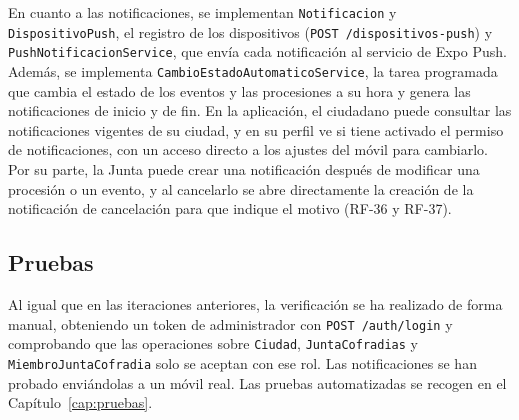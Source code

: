 En cuanto a las notificaciones, se implementan \texttt{Notificacion} y \texttt{DispositivoPush}, el registro de los dispositivos (\texttt{POST /dispositivos-push}) y \texttt{PushNotificacionService}, que envía cada notificación al servicio de Expo Push. Además, se implementa \texttt{CambioEstadoAutomaticoService}, la tarea programada que cambia el estado de los eventos y las procesiones a su hora y genera las notificaciones de inicio y de fin. En la aplicación, el ciudadano puede consultar las notificaciones vigentes de su ciudad, y en su perfil ve si tiene activado el permiso de notificaciones, con un acceso directo a los ajustes del móvil para cambiarlo. Por su parte, la Junta puede crear una notificación después de modificar una procesión o un evento, y al cancelarlo se abre directamente la creación de la notificación de cancelación para que indique el motivo (RF-36 y RF-37).


\subsection{Pruebas}

Al igual que en las iteraciones anteriores, la verificación se ha realizado de forma manual, obteniendo un token de administrador con \texttt{POST /auth/login} y comprobando que las operaciones sobre \texttt{Ciudad}, \texttt{JuntaCofradias} y \texttt{MiembroJuntaCofradia} solo se aceptan con ese rol. Las notificaciones se han probado enviándolas a un móvil real. Las pruebas automatizadas se recogen en el Capítulo~\ref{cap:pruebas}.
